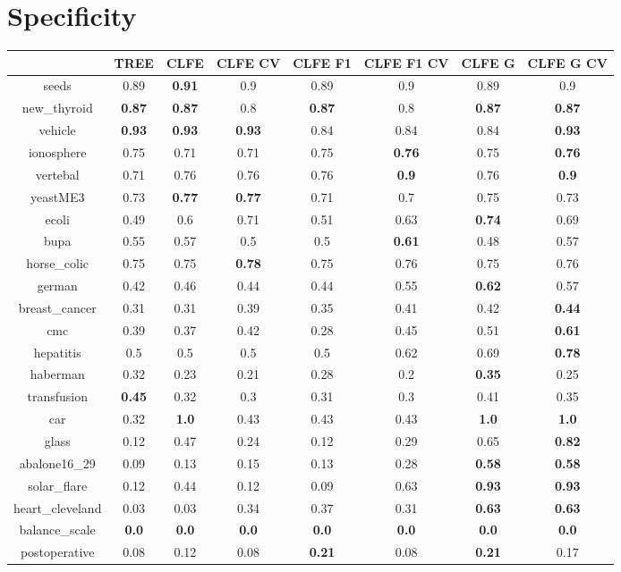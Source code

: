 \documentclass{article}%
\begin{document}
%
\section*{Specificity}%
\begin{tabular}{c|ccccccc}%
\hline%
&TREE&CLFE&CLFE CV&CLFE F1&CLFE F1 CV&CLFE G&CLFE G CV\\%
\hline%
seeds&0.89&\textbf{0.91}&0.9&0.89&0.9&0.89&0.9\\%
new\_thyroid&\textbf{0.87}&\textbf{0.87}&0.8&\textbf{0.87}&0.8&\textbf{0.87}&\textbf{0.87}\\%
vehicle&\textbf{0.93}&\textbf{0.93}&\textbf{0.93}&0.84&0.84&0.84&\textbf{0.93}\\%
ionosphere&0.75&0.71&0.71&0.75&\textbf{0.76}&0.75&\textbf{0.76}\\%
vertebal&0.71&0.76&0.76&0.76&\textbf{0.9}&0.76&\textbf{0.9}\\%
yeastME3&0.73&\textbf{0.77}&\textbf{0.77}&0.71&0.7&0.75&0.73\\%
ecoli&0.49&0.6&0.71&0.51&0.63&\textbf{0.74}&0.69\\%
bupa&0.55&0.57&0.5&0.5&\textbf{0.61}&0.48&0.57\\%
horse\_colic&0.75&0.75&\textbf{0.78}&0.75&0.76&0.75&0.76\\%
german&0.42&0.46&0.44&0.44&0.55&\textbf{0.62}&0.57\\%
breast\_cancer&0.31&0.31&0.39&0.35&0.41&0.42&\textbf{0.44}\\%
cmc&0.39&0.37&0.42&0.28&0.45&0.51&\textbf{0.61}\\%
hepatitis&0.5&0.5&0.5&0.5&0.62&0.69&\textbf{0.78}\\%
haberman&0.32&0.23&0.21&0.28&0.2&\textbf{0.35}&0.25\\%
transfusion&\textbf{0.45}&0.32&0.3&0.31&0.3&0.41&0.35\\%
car&0.32&\textbf{1.0}&0.43&0.43&0.43&\textbf{1.0}&\textbf{1.0}\\%
glass&0.12&0.47&0.24&0.12&0.29&0.65&\textbf{0.82}\\%
abalone16\_29&0.09&0.13&0.15&0.13&0.28&\textbf{0.58}&\textbf{0.58}\\%
solar\_flare&0.12&0.44&0.12&0.09&0.63&\textbf{0.93}&\textbf{0.93}\\%
heart\_cleveland&0.03&0.03&0.34&0.37&0.31&\textbf{0.63}&\textbf{0.63}\\%
balance\_scale&\textbf{0.0}&\textbf{0.0}&\textbf{0.0}&\textbf{0.0}&\textbf{0.0}&\textbf{0.0}&\textbf{0.0}\\%
postoperative&0.08&0.12&0.08&\textbf{0.21}&0.08&\textbf{0.21}&0.17\\%
\end{tabular}
\end{document}

